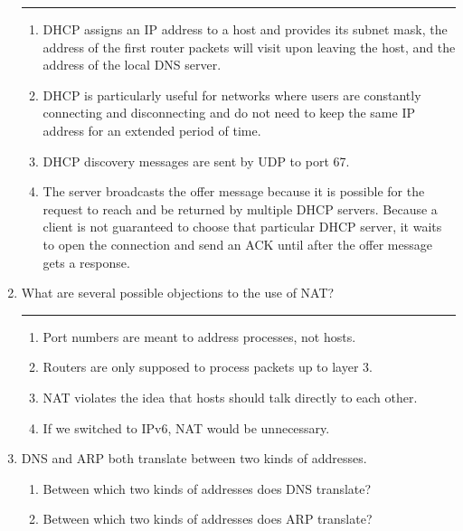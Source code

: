 \documentclass[twoside]{article}
\newenvironment{answer}
  {\vspace*{0.2cm} \rule{12cm}{0.04cm} \vspace*{0.2cm}}
  {\vspace*{0.2cm}}
\begin{document}
\begin{enumerate}
\begin{answer}
  \begin{enumerate}
    \item DHCP assigns an IP address to a host and provides its subnet mask, the address 
    	of the first router packets will visit upon leaving the host, and the address of 
	the local DNS server.
    \item DHCP is particularly useful for networks where users are constantly connecting and 
    	disconnecting and do not need to keep the same IP address for an extended period 
	of time.
    \item DHCP discovery messages are sent by UDP to port 67.
    \item The server broadcasts the offer message because it is possible for the request to 
    	reach and be returned by multiple DHCP servers. Because a client is not guaranteed 
	to choose that particular DHCP server, it waits to open the connection and send an 
	ACK until after the offer message gets a response.
    \end{enumerate}

    \end{answer}

  \item What are several possible objections to the use of NAT?

  \begin{answer}

  \begin{enumerate}
    \item Port numbers are meant to address processes, not hosts.
    \item Routers are only supposed to process packets up to layer 3.
    \item NAT violates the idea that hosts should talk directly to each other.
    \item If we switched to IPv6, NAT would be unnecessary.
    \end{enumerate}

    \end{answer}

  \item DNS and ARP both translate between two kinds of addresses.
  \begin{enumerate}
    \item Between which two kinds of addresses does DNS translate?
    \item Between which two kinds of addresses does ARP translate?
    \end{enumerate}


\end{enumerate}
\end{document}
